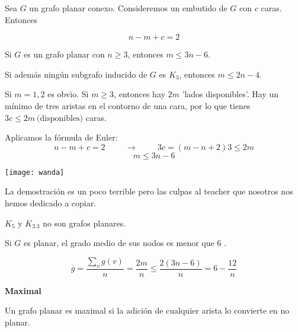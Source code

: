 \documentclass[openany]{book}
\begin{document}
\begin{theorem}
  Sea $G$ un grafo planar conexo. Consideremos un embutido de $G$ con $c$ caras. Entonces

  $$
  n-m+c=2
  $$

\end{theorem}

\begin{proposition}
  Si $G$ es un grafo planar con $n \geq 3$, entonces $m \leq 3 n-6$.

  Si además ningún subgrafo inducido de $G$ es $K_{3}$, entonces $m \leq 2 n-4$.
\end{proposition}

\begin{demonstration}
  Si $ m=1,2 $ es obvio. Si $m \geq 3$, entonces hay $2m$ 'lados disponibles'. Hay un mínimo de tres aristas en el contorno de una cara, por lo que tienes $3c \leq 2m\ \text{(disponibles)}$ caras.

  Aplicamos la fórmula de Euler:
  $$ n-m+c=2 \hspace{1cm}\to \hspace{1cm}3c=(m-n+2)3 \leq 2m $$
  $$ m \leq 3n-6 $$


  \begin{minipage}[l]{0.1\textwidth}
    \texttt{[image: wanda]}
  \end{minipage}
  \begin{minipage}[l]{0.8\textwidth}
    La demostración es un poco terrible pero las culpas al teacher que nosotros nos hemos dedicado a copiar.
  \end{minipage}
\end{demonstration}

\begin{proposition}
  $K_{5}$ y $K_{3.3}$ no son grafos planares.
\end{proposition}

\begin{proposition}
  Si $G$ es planar, el grado medio de sus nodos es menor que 6 .
\end{proposition}

\begin{demonstration}
    $$ \overline{g} = \dfrac{\sum\limits_{v}^{}g(v)}{n} = \dfrac{2m}{n} \leq \dfrac{2(3n-6)}{n} = 6-\dfrac{12}{n} $$
\end{demonstration}

\begin{definition}
  { \color{turquoise} \textbf{Maximal}}


  Un grafo planar es maximal si la adición de cualquier arista lo convierte en no planar.

\end{definition}
\end{document}
